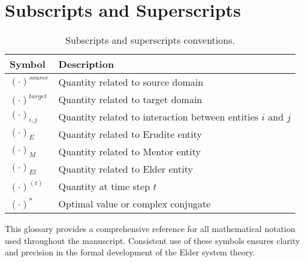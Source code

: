 \section{Subscripts and Superscripts}

\begin{table}[h]
\centering
\begin{tabular}{|l|p{10cm}|}
\hline
\textbf{Symbol} & \textbf{Description} \\
\hline
$(\cdot)^{source}$ & Quantity related to source domain \\
\hline
$(\cdot)^{target}$ & Quantity related to target domain \\
\hline
$(\cdot)_{i,j}$ & Quantity related to interaction between entities $i$ and $j$ \\
\hline
$(\cdot)_E$ & Quantity related to Erudite entity \\
\hline
$(\cdot)_M$ & Quantity related to Mentor entity \\
\hline
$(\cdot)_{El}$ & Quantity related to Elder entity \\
\hline
$(\cdot)^{(t)}$ & Quantity at time step $t$ \\
\hline
$(\cdot)^*$ & Optimal value or complex conjugate \\
\hline
\end{tabular}
\caption{Subscripts and superscripts conventions.}
\label{tab:symbols_subscripts}
\end{table}

This glossary provides a comprehensive reference for all mathematical notation used throughout the manuscript. Consistent use of these symbols ensures clarity and precision in the formal development of the Elder system theory.